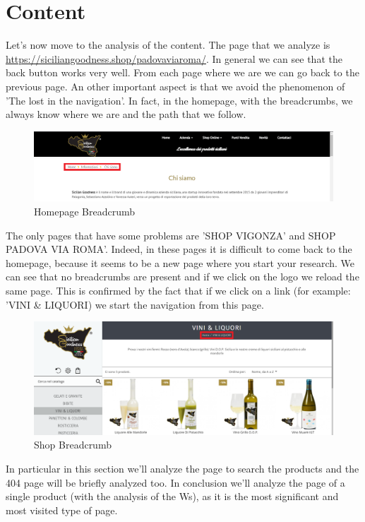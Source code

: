 \section{Content}

Let's now move to the analysis of the content.
The page that we analyze is \url{https://siciliangoodness.shop/padovaviaroma/}. 
In general we can see that the back button works very well. From each page where we are we can go back to the previous page.
An other important aspect is that we avoid the phenomenon of 'The lost in the navigation'. In fact, in the homepage, with the breadcrumbs, we always know where we are and the path that we follow. 

\begin{figure}[H]
	\centering\includegraphics[width=12cm]{Img/bred2.png}
	\caption{Homepage Breadcrumb}
\end{figure}

The only pages that have some problems are 'SHOP VIGONZA' and SHOP PADOVA VIA ROMA'. Indeed, in these pages it is difficult to come back to the homepage, because it seems to be a new page where you start your research. We can see that no breadcrumbs are present and if we click on the logo we reload the same page. This is confirmed by the fact that if we click on a link (for example: 'VINI \& LIQUORI) we start the navigation from this page.

\begin{figure}[H]
	\centering\includegraphics[width=12cm]{Img/bred1.png}
	\caption{Shop Breadcrumb}
\end{figure} 

In particular in this section we'll analyze the page to search the products and the 404 page will be briefly analyzed too. In conclusion we'll analyze the page of a single product (with the analysis of the Ws), as it is the most significant and most visited type of page.

